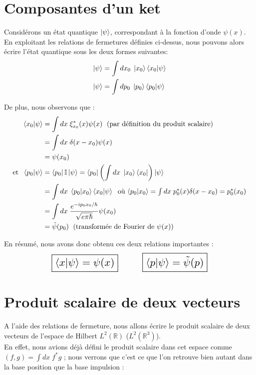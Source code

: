 \documentclass[../notesdecours]{subfiles}
\begin{document}
\section{Composantes d'un ket}

Considérons un état quantique $\ket{\psi}$, correspondant à la fonction d'onde $\psi(x)$. En exploitant les relations de fermetures définies ci-dessus, nous pouvons alors écrire l'état quantique sous les deux formes suivantes:
\begin{align}
\ket{\psi} &= \int dx_0 \; \ket{x_0} \braket{x_0|\psi} \\
\ket{\psi} &= \int dp_0 \; \ket{p_0} \braket{p_0|\psi}
\end{align}

De plus, nous observons que : 
\begin{align}
    \braket{x_0| \psi} &= \int dx \; \xi_{x_0}^*(x) \psi(x) \; \mbox{ (par définition du produit scalaire)} \\
    &= \int dx \; \delta(x-x_0)\psi(x) \\
    &= \psi(x_0)\\
    \mbox{et } \; \braket{p_0|\psi} &= \bra{p_0}\mathbb{I}\ket{\psi} = \bra{p_0} \left( \int dx \; \ket{x_0} \bra{x_0} \right) \ket{\psi} \\
    &= \int dx \; \braket{p_0|x_0} \braket{x_0|\psi} \; \mbox{ où $\braket{p_0|x_0} = \int dx \; p_0^*(x) \delta(x-x_0) = p_0^*(x_0)$} \\
    &= \int dx \; \frac{e^{-ip_0x_0/\hbar}}{\sqrt{e\pi \hbar}} \psi(x_0) \\
	&= \tilde{\psi}(p_0) \; \mbox{ (transformée de Fourier de $\psi(x)$)} \label{eq:chap6-psi_p}\\
\end{align}

En résumé, nous avons donc obtenu ces deux relations importantes :
$$
\scalebox{1.5}{
	\boxed{\braket{x|\psi} = \psi(x)}
	\qquad 
	\boxed{ \braket{p|\psi} = \tilde{\psi}(p)}
}
$$



\section{Produit scalaire de deux vecteurs}
A l'aide des relations de fermeture, nous allons écrire le produit scalaire de deux vecteurs de l'espace de Hilbert $L^2(\mathbb{R})$ ($L^2(\mathbb{R}^3)$). \\
En effet, nous avions déjà défini le produit scalaire dans cet espace comme $(f,g) = \int dx \; f^* g$ ; nous verrons que c'est ce que l'on retrouve bien autant dans la base position que la base impulsion : 
\end{document}
